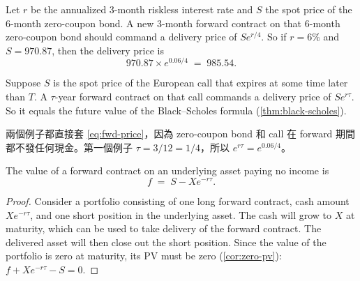 
\begin{eg}
	Let $r$ be the annualized 3-month riskless interest rate and $S$ the spot price of the 6-month zero-coupon bond.
	A new 3-month forward contract on that 6-month zero-coupon bond should command a delivery price of $Se^{r/4}$.
	So if $r=6\%$ and $S=970.87$, then the delivery price is
	\[
		970.87\times e^{0.06/4} \;=\; 985.54 .
	\]
\end{eg}

\begin{eg}[Options]
	Suppose $S$ is the spot price of the European call that expires at some time later than $T$.
	A $\tau$-year forward contract on that call commands a delivery price of $Se^{r\tau}$.
	So it equals the future value of the Black--Scholes formula (\autoref{thm:black-scholes}).
\end{eg}

\suppstart
{}

\begin{remark}
	兩個例子都直接套 \eqref{eq:fwd-price}，因為 zero-coupon bond 和 call 在 forward 期間都不發任何現金。第一個例子 $\tau=3/12=1/4$，所以 $e^{r\tau}=e^{0.06/4}$。
\end{remark}
\suppend


\begin{proposition}
	\label{prop:fwd-value}
	The value of a forward contract on an underlying asset paying no income is
	\begin{equation}
		f \;=\; S-Xe^{-r\tau} .
		\label{eq:fwd-value}
	\end{equation}
\end{proposition}

\begin{proof}
	Consider a portfolio consisting of one long forward contract, cash amount $Xe^{-r\tau}$, and one short position in the underlying asset.
	The cash will grow to $X$ at maturity, which can be used to take delivery of the forward contract.
	The delivered asset will then close out the short position.
	Since the value of the portfolio is zero at maturity, its PV must be zero (\autoref{cor:zero-pv}): $f+Xe^{-r\tau}-S=0$.
\end{proof}

